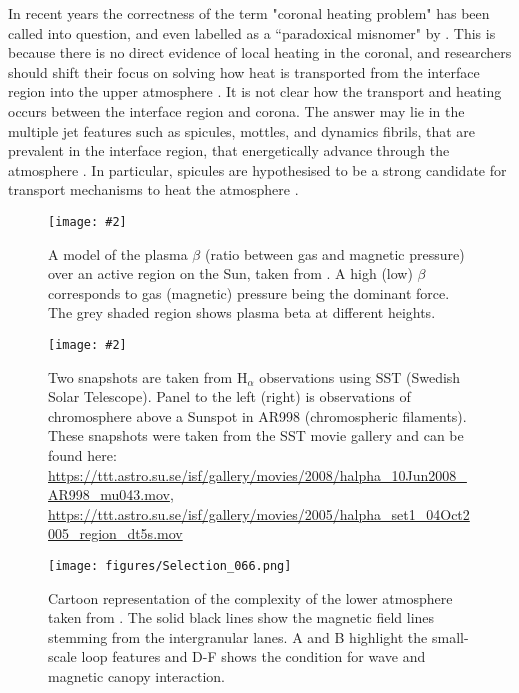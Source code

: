 \documentclass[12pt]{ociamthesis}
\newcommand{\mfig}[4]{
  \begin{figure}
  \begin{center}
  \texttt{[image: \#2]}
  \caption{#3}
  \label{#4}
  \end{center}
  \end{figure}}
\begin{document}
%
In recent years the correctness of the term "coronal heating problem" has been called into question, and even labelled as a ``paradoxical misnomer" by \cite{Aschwanden2007ApJ}. This is because there is no direct evidence of local heating in the coronal, and researchers should shift their focus on solving how heat is transported from the interface region into the upper atmosphere \citep{Aschwanden2007ApJ}. It is not clear how the transport and heating occurs between the interface region and corona. The answer may lie in the multiple jet features such as spicules, mottles, and dynamics fibrils, that are prevalent in the interface region, that energetically advance through the atmosphere \citep{Tsiropoula2012}. In particular, spicules are hypothesised to be a strong candidate for transport mechanisms to heat the atmosphere \citep{Kudoh1999ApJ514493K, Pontieu2007PASJ, Kudoh2008IAUS247195K, Martinez-Sykora2017,Moore2011ApJ731L18M, Pontieu2017ApJ, Samanta2019Sci, Zuo2019AcASn, Bale2019Natur}.    
\mfig{0.725}{figures/Selection_067.png}{A model of the plasma $\beta$ (ratio between gas and magnetic pressure) over an active region on the Sun, taken from \citep{Gary2001SoPh20371G}. A high (low) $\beta$ corresponds to gas (magnetic) pressure being the dominant force. The grey shaded region shows plasma beta at different heights.}{beta_profile_sun}
\mfig{1}{figures/messy_chrom.png}{Two snapshots are taken from H$_\alpha$ observations using SST (Swedish Solar Telescope). Panel to the left (right) is observations of chromosphere above a Sunspot in AR998  (chromospheric filaments). These snapshots were taken from the SST movie gallery and can be found here: \url{https://ttt.astro.su.se/isf/gallery/movies/2008/halpha_10Jun2008_AR998_mu043.mov}, \url{https://ttt.astro.su.se/isf/gallery/movies/2005/halpha_set1_04Oct2005_region_dt5s.mov}}{messy_chromo}
\begin{sidewaysfigure}[ht]
    \texttt{[image: figures/Selection\_066.png]}
    \caption{Cartoon representation of the complexity of the lower atmosphere taken from \cite{Wedemeyer2009SSRv144317W}. The solid black lines show the magnetic field lines stemming from the intergranular lanes. A and B highlight the small-scale loop features and D-F shows the condition for wave and magnetic canopy interaction.}
    \label{fig:chromo_Cart}
\end{sidewaysfigure}
\end{document}
